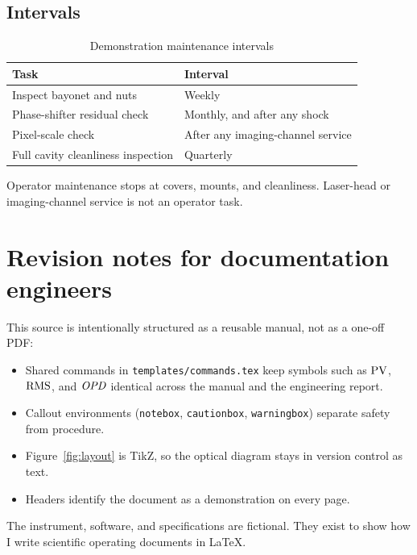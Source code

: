 \section{Intervals}

\begin{table}[ht]
\centering
\caption{Demonstration maintenance intervals}
\begin{tabular}{@{}ll@{}}
\toprule
Task & Interval \\
\midrule
Inspect bayonet and nuts & Weekly \\
Phase-shifter residual check & Monthly, and after any shock \\
Pixel-scale check & After any imaging-channel service \\
Full cavity cleanliness inspection & Quarterly \\
\bottomrule
\end{tabular}
\end{table}

Operator maintenance stops at covers, mounts, and cleanliness. Laser-head or imaging-channel service is not an operator task.

\chapter{Revision notes for documentation engineers}

This source is intentionally structured as a reusable manual, not as a one-off PDF:

\begin{itemize}
  \item Shared commands in \texttt{templates/commands.tex} keep symbols such as \(\mathrm{PV}\), \(\mathrm{RMS}\), and \(\mathit{OPD}\) identical across the manual and the engineering report.
  \item Callout environments (\texttt{notebox}, \texttt{cautionbox}, \texttt{warningbox}) separate safety from procedure.
  \item Figure~\ref{fig:layout} is TikZ, so the optical diagram stays in version control as text.
  \item Headers identify the document as a demonstration on every page.
\end{itemize}

The instrument, software, and specifications are fictional. They exist to show how I write scientific operating documents in LaTeX.


